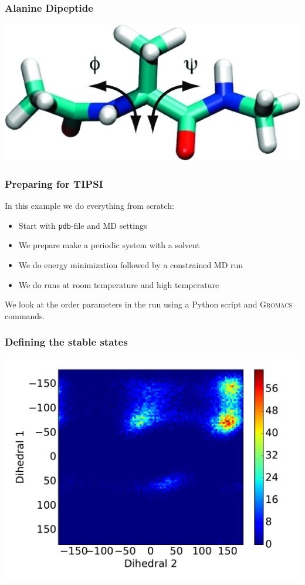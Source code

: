 \documentclass[hyperref={pdfpagelabels=false}]{beamer}
\begin{document}
\begin{frame}
\frametitle{Alanine Dipeptide} 
\begin{center}
\includegraphics[scale=0.4]{images/alanine.png}
\end{center}
\end{frame}

\begin{frame}
\frametitle{Preparing for \textsc{TIPSI}} 
In this example we do everything from scratch:
\begin{itemize}
\item Start with \texttt{pdb}-file and MD settings
\item We prepare make a periodic system with a solvent
\item We do energy minimization followed by a constrained MD run
\item We do runs at room temperature and high temperature
\end{itemize}
We look at the order parameters in the run using a Python script and \textsc{Gromacs} commands.
\end{frame}

\begin{frame}
\frametitle{Defining the stable states} 
\begin{center}
\includegraphics[scale=0.4]{images/C_2D.pdf}
\end{center}
\end{frame}
\end{document}
